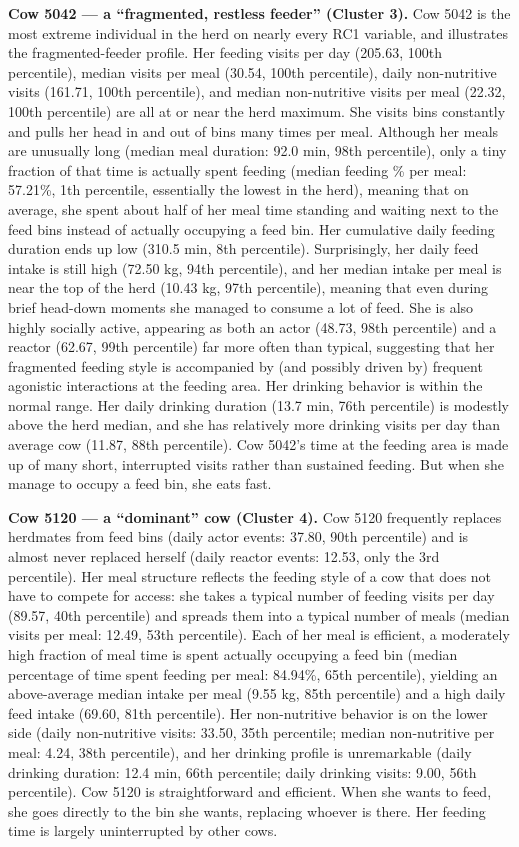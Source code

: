 \documentclass[
]{article}
\begin{document}
\textbf{Cow 5042 --- a ``fragmented, restless feeder'' (Cluster 3).} Cow
5042 is the most extreme individual in the herd on nearly every RC1
variable, and illustrates the fragmented-feeder profile. Her feeding
visits per day (205.63, 100th percentile), median visits per meal
(30.54, 100th percentile), daily non-nutritive visits (161.71, 100th
percentile), and median non-nutritive visits per meal (22.32, 100th
percentile) are all at or near the herd maximum. She visits bins
constantly and pulls her head in and out of bins many times per meal.
Although her meals are unusually long (median meal duration: 92.0 min,
98th percentile), only a tiny fraction of that time is actually spent
feeding (median feeding \% per meal: 57.21\%, 1th percentile,
essentially the lowest in the herd), meaning that on average, she spent
about half of her meal time standing and waiting next to the feed bins
instead of actually occupying a feed bin. Her cumulative daily feeding
duration ends up low (310.5 min, 8th percentile). Surprisingly, her
daily feed intake is still high (72.50 kg, 94th percentile), and her
median intake per meal is near the top of the herd (10.43 kg, 97th
percentile), meaning that even during brief head-down moments she
managed to consume a lot of feed. She is also highly socially active,
appearing as both an actor (48.73, 98th percentile) and a reactor
(62.67, 99th percentile) far more often than typical, suggesting that
her fragmented feeding style is accompanied by (and possibly driven by)
frequent agonistic interactions at the feeding area. Her drinking
behavior is within the normal range. Her daily drinking duration (13.7
min, 76th percentile) is modestly above the herd median, and she has
relatively more drinking visits per day than average cow (11.87, 88th
percentile). Cow 5042's time at the feeding area is made up of many
short, interrupted visits rather than sustained feeding. But when she
manage to occupy a feed bin, she eats fast.

\textbf{Cow 5120 --- a ``dominant'' cow (Cluster 4).} Cow 5120
frequently replaces herdmates from feed bins (daily actor events: 37.80,
90th percentile) and is almost never replaced herself (daily reactor
events: 12.53, only the 3rd percentile). Her meal structure reflects the
feeding style of a cow that does not have to compete for access: she
takes a typical number of feeding visits per day (89.57, 40th
percentile) and spreads them into a typical number of meals (median
visits per meal: 12.49, 53th percentile). Each of her meal is efficient,
a moderately high fraction of meal time is spent actually occupying a
feed bin (median percentage of time spent feeding per meal: 84.94\%,
65th percentile), yielding an above-average median intake per meal (9.55
kg, 85th percentile) and a high daily feed intake (69.60, 81th
percentile). Her non-nutritive behavior is on the lower side (daily
non-nutritive visits: 33.50, 35th percentile; median non-nutritive per
meal: 4.24, 38th percentile), and her drinking profile is unremarkable
(daily drinking duration: 12.4 min, 66th percentile; daily drinking
visits: 9.00, 56th percentile). Cow 5120 is straightforward and
efficient. When she wants to feed, she goes directly to the bin she
wants, replacing whoever is there. Her feeding time is largely
uninterrupted by other cows.
\end{document}
